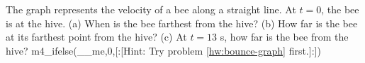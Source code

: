  The graph represents the velocity of a bee along a
straight line.  At $t=0$, the bee is at the hive.  (a) When
is the bee farthest from the hive? (b) How far is the bee at
its farthest point from the hive? (c) At $t=13$ s, how far is
the bee from the hive? 
m4_ifelse(__me,0,[:[Hint: Try problem \ref{hw:bounce-graph} first.]:]) \answercheck
